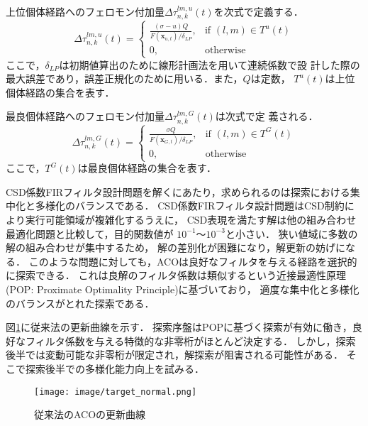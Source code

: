 \documentclass[dvipdfmx,9pt]{ieej}
\begin{document}
上位個体経路へのフェロモン付加量$\Delta\tau^{lm,u}_{n, k}(t)$を次式で定義する．
   \begin{equation}
    \Delta\tau^{lm,u}_{n,k}(t)=\left\{
   \begin{array}{ll}
   \displaystyle{\frac{(\sigma-u)Q}{F(\bm{x}_{u, t})/\delta_{LP}}}, & \mbox{if }
    (l,m) \in T^{u}(t)\\
   0, & \mbox{otherwise}
   \end{array}
   \right.
   \end{equation}
ここで，$\delta_{LP}$は初期値算出のために線形計画法を用いて連続係数で設
計した際の最大誤差であり，誤差正規化のために用いる．また，$Q$は定数，
$T^{u}(t)$は上位個体経路の集合を表す．
   
最良個体経路へのフェロモン付加量$\Delta\tau^{lm, G}_{n, k}(t)$は次式で定
義される．
   \begin{equation}
    \Delta\tau^{lm, G}_{n, k}(t)=\left\{
   \begin{array}{ll}
   \displaystyle{\frac{\sigma Q}{F(\bm{x}_{G, t})/\delta_{LP}}}, & \mbox{if } (l,m) \in
     T^{G}(t)\\
   0, & \mbox{otherwise}
   \end{array}
   \right.
   \end{equation}
ここで，$T^{G}(t)$は最良個体経路の集合を表す．

CSD係数FIRフィルタ設計問題を解くにあたり，求められるのは探索における集中化と多様化のバランスである．
CSD係数FIRフィルタ設計問題はCSD制約により実行可能領域が複雑化するうえに，
CSD表現を満たす解は他の組み合わせ最適化問題と比較して，目的関数値が
$10^{-1}～10^{-3}$と小さい．
狭い値域に多数の解の組み合わせが集中するため，
解の差別化が困難になり，解更新の妨げになる．
このような問題に対しても，ACOは良好なフィルタを与える経路を選択的に探索できる．
これは良解のフィルタ係数は類似するという近接最適性原理 (POP: Proximate Optimality Principle)\cite{POP}に基づいており，
適度な集中化と多様化のバランスがとれた探索である．

図\ref{fig:updating}に従来法の更新曲線を示す．
探索序盤はPOPに基づく探索が有効に働き，良好なフィルタ係数を与える特徴的な非零桁がほとんど決定する．
しかし，探索後半では変動可能な非零桁が限定され，解探索が阻害される可能性がある．
そこで探索後半での多様化能力向上を試みる．

\begin{figure}[ht]
 \begin{center}
  \texttt{[image: image/target\_normal.png]}
 \end{center}
 \caption{従来法のACOの更新曲線}
\label{fig:updating}
\end{figure}
\end{document}
